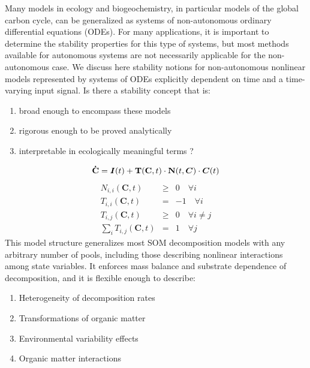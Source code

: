 \begin{minipage}[height=\columnheight]{\textwidth}
\begin{multicols*}{3}
  	Many models in ecology and biogeochemistry, in particular models of the global
  	carbon cycle, can be generalized as systems of non-autonomous ordinary
  	differential equations (ODEs). For many applications, it is important to
  	determine the stability properties for this type of systems, but most methods
  	available for autonomous systems are not necessarily applicable for the
  	non-autonomous case.  We discuss here stability notions for non-autonomous
  	nonlinear models represented by systems of ODEs explicitly dependent on time
  	and a time-varying input signal.  
  	Is there a stability concept that is:
  	\begin{enumerate}
  		\item
  		broad enough to encompass these models
  		\item
  		rigorous enough to be proved analytically 
  		\item
  		interpretable in ecologically meaningful terms ?
  	\end{enumerate}
    		\[
		\mathbf{\dot{C}}= \bm{I}(t) + {\bf T}(\mathbf{C},t) \cdot {\bf N}(t, \bm{C}) \cdot \bm{C}(t)
    		\]
    		\begin{equation*}	
    		\label{structCond}
    		\begin{array}{lcl}	
    		N_{i,i}(\mathbf{C},t) 		&\ge& 	 0 \quad \forall i \\
    		T_{i,i}(\mathbf{C},t) 		&=& 	 -1 \quad \forall i \\
    		T_{i,j}(\mathbf{C},t) 		&\ge& 	 0 \quad \forall i \ne j \\
    		\sum_i T_{i,j}(\mathbf{C},t) 	&=  &	 1\quad \forall j 
    		\end{array}	
    		\end{equation*}	
    		This model structure generalizes most SOM decomposition models with any arbitrary number of pools, including those describing nonlinear interactions among state variables. It enforces mass balance and substrate dependence of decomposition, and it is flexible enough to describe:
		\begin{enumerate}
		\item Heterogeneity of decomposition rates
		\item Transformations of organic matter
		\item Environmental variability effects
		\item Organic matter interactions
		\end{enumerate}


\end{multicols*}
\end{minipage}
